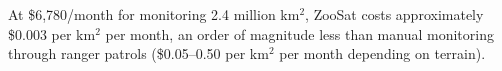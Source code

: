 At \$6,780/month for monitoring 2.4 million km$^2$, ZooSat costs approximately \$0.003 per km$^2$ per month, an order of magnitude less than manual monitoring through ranger patrols (\$0.05--0.50 per km$^2$ per month depending on terrain).

